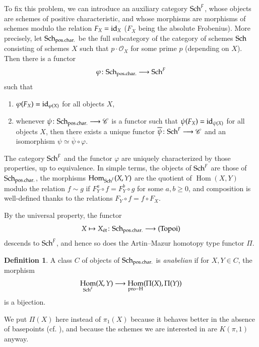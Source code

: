 \documentclass[twoside]{amsart}
\newcommand{\Cc}{\mathscr{C}}
\newcommand{\Oo}{\mathscr{O}}
\newcommand{\et}{{\rm\acute{e}t}}
\newcommand{\id}{{\rm id}}
\DeclareMathOperator{\Hom}{Hom}
\newcommand{\isom}{\simeq}
\newcommand{\xto}{\xlongrightarrow}
\renewcommand{\phi}{\varphi}
\renewcommand{\to}{\longrightarrow}
\renewcommand{\bar}{\overline}
\theoremstyle{plain}
\theoremstyle{definition}
\newtheorem{definition}[subsubsection]{Definition}
\theoremstyle{remark}
\numberwithin{equation}{subsection}
\begin{document}
To fix this problem, we can introduce an auxiliary category ${\rm Sch}^F$, whose objects are schemes of positive characteristic, and whose morphisms are morphisms of schemes modulo the relation $F_X = \id_X$ ($F_X$ being the absolute Frobenius). More precisely, let ${\rm Sch}_{\rm pos.char.}$ be the full subcategory of the category of schemes ${\rm Sch}$ consisting of schemes $X$ such that $p\cdot \Oo_X$ for some prime $p$ (depending on $X$). Then there is a functor 
\[ 
	\phi\colon {\rm Sch}_{\rm pos.char.} \to {\rm Sch}^F 
\]
such that
\begin{enumerate}[(1)]
	\item $\phi(F_X) = \id_{\phi(X)}$ for all objects $X$,
	\item whenever $\psi\colon {\rm Sch}_{\rm pos.char.} \to \Cc$ is a functor such that $\psi(F_X) = \id_{\psi(X)}$ for all objects $X$, then there exists a unique functor $\bar\psi\colon {\rm Sch}^F \to \Cc$ and an isomorphism $\psi\isom \bar\psi\circ \phi$.
\end{enumerate}
The category ${\rm Sch}^F$ and the functor $\phi$ are uniquely characterized by those properties, up to equivalence. In simple terms, the objects of ${\rm Sch}^F$ are those of ${\rm Sch}_{\rm pos.char.}$, the morphisms $\Hom_{{\rm Sch}^F}(X, Y)$ %
are the quotient of $\Hom(X, Y)$ modulo the relation $f\sim g$ if $F_Y^a\circ f = F_Y^b\circ g$ for some $a, b\geq 0$, and composition is well-defined thanks to the relations $F_Y\circ f = f\circ F_X$.

By the universal property, the functor 
\[ 
	X\mapsto X_\et \colon {\rm Sch}_{\rm pos.char.} \to (\rm Topoi)
\]
descends to ${\rm Sch}^F$, and hence so does the Artin--Mazur homotopy type functor $\Pi$.

\begin{definition} 
A class $C$ of objects of ${\rm Sch}_{\rm pos.char.}$ is \emph{anabelian} if for $X, Y\in C$, the morphism
\begin{equation} \label{eqn:anabelian-map} 
	\Hom_{{\rm Sch}^F}(X, Y)\to \Hom_{\rm pro-H}(\Pi(X), \Pi(Y))
\end{equation}
is a bijection.
\end{definition}

We put $\Pi(X)$ here instead of $\pi_1(X)$ because it behaves better in the absence of basepoints (cf. \cite[\S 2.2]{SchmidtStix}), and because the schemes we are interested in are $K(\pi, 1)$ anyway. 
\end{document}
